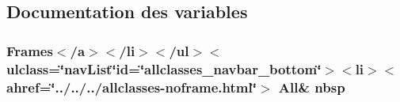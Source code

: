 \subsection{Documentation des variables}
\hypertarget{com_2cloudia_2_database_2package-summary_8html_aff329d23a24e17d925e4078265e1c7cf}{
\subsubsection[{nbsp}]{\setlength{\rightskip}{0pt plus 5cm}Frames$<$/{\bf a}$>$$<$/li$>$$<$/ul$>$$<$ulclass=\char`\"{}nav\-List\char`\"{}id=\char`\"{}allclasses\-\_\-navbar\-\_\-bottom\char`\"{}$>$$<$li$>$$<$ahref=\char`\"{}../../../allclasses-\/noframe.\-html\char`\"{}$>$ All\& nbsp}}\label{com_2cloudia_2_database_2package-summary_8html_aff329d23a24e17d925e4078265e1c7cf}
